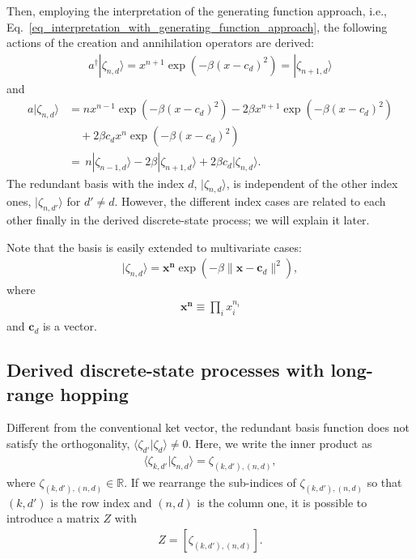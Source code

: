 \documentclass[sn-mathphys,Numbered]{sn-jnl}%
\theoremstyle{thmstyleone}%
\theoremstyle{thmstyletwo}%
\theoremstyle{thmstylethree}%
\begin{document}
Then, employing the interpretation of the generating function approach, i.e., Eq.~\eqref{eq_interpretation_with_generating_function_approach}, the following actions of the creation and annihilation operators are derived:
\begin{align}
a^\dagger |\zeta_{n,d} \rangle = x^{n+1} \exp\left( - \beta ( x - c_d )^2 \right) =  |\zeta_{n+1,d} \rangle
\label{eq_redundant_basis_with_creation}
\end{align}
and
\begin{align}
a |\zeta_{n,d} \rangle &= n x^{n-1} \exp\left( - \beta ( x - c_d )^2 \right) - 2\beta x^{n+1} \exp\left( - \beta ( x - c_d )^2 \right)  \nonumber \\
&\quad + 2 \beta c_d x^{n}  \exp\left( - \beta ( x - c_d )^2 \right) \nonumber \\
&= \, n |\zeta_{n-1,d} \rangle - 2\beta |\zeta_{n+1,d} \rangle  + 2 \beta c_d |\zeta_{n,d} \rangle.
\label{eq_redundant_basis_with_annihilation}
\end{align}
The redundant basis with the index $d$, $|\zeta_{n,d} \rangle$, is independent of the other index ones, $|\zeta_{n,d'} \rangle$ for $d' \neq d$. However, the different index cases are related to each other finally in the derived discrete-state process; we will explain it later.

Note that the basis is easily extended to multivariate cases:
\begin{align}
|\zeta_{n,d} \rangle = \bm{x}^{\bm{n}} \exp\left( - \beta \| \bm{x} - \bm{c}_d \|^2 \right),
\end{align}
where 
\begin{align}
\bm{x}^{\bm{n}} \equiv \prod_{i} x_i^{n_i}
\end{align}
and $\bm{c}_d$ is a vector.


\subsection{Derived discrete-state processes with long-range hopping}
\label{subsec_derivation_dual_process}

Different from the conventional ket vector, the redundant basis function does not satisfy the orthogonality, $\langle \zeta_{d'} | \zeta_d \rangle \neq 0$. Here, we write the inner product as
\begin{align}
\langle \zeta_{k,d'} | \zeta_{n,d} \rangle = \zeta_{(k,d'),(n,d)},
\label{eq_inner_product_for_Z}
\end{align}
where $\zeta_{(k,d'),(n,d)} \in \mathbb{R}$. If we rearrange the sub-indices of $\zeta_{(k,d'),(n,d)}$ so that $(k,d')$ is the row index and $(n,d)$ is the column one, it is possible to introduce a matrix $Z$ with
\begin{align}
Z = \left[\zeta_{(k,d'),(n,d)}\right].
\label{eq_definition_Z}
\end{align}
\end{document}
